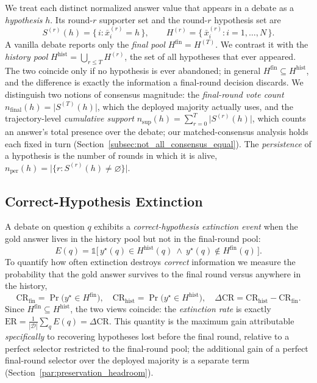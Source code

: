 We treat each distinct normalized answer value that appears in a debate as a \emph{hypothesis} $h$. Its
round-$r$ supporter set and the round-$r$ hypothesis set are
\begin{equation}
S^{(r)}(h)=\{\,i : \bar{x}_i^{(r)}=h\,\},\qquad
H^{(r)}=\{\,\bar{x}_i^{(r)} : i=1,\dots,N\,\}.
\end{equation}
A vanilla debate reports only the \emph{final pool} $H^{\mathrm{fin}}=H^{(T)}$. We contrast it with the
\emph{history pool} $H^{\mathrm{hist}}=\bigcup_{r\le T}H^{(r)}$, the set of all hypotheses that ever
appeared. The two coincide only if no hypothesis is ever abandoned; in general
$H^{\mathrm{fin}}\subseteq H^{\mathrm{hist}}$, and the difference is exactly the information a final-round
decision discards. We distinguish two notions of consensus magnitude: the \emph{final-round vote count}
$n_{\mathrm{final}}(h)=\lvert S^{(T)}(h)\rvert$, which the deployed majority actually uses, and the
trajectory-level \emph{cumulative support} $n_{\mathrm{sup}}(h)=\sum_{r=0}^{T}\lvert S^{(r)}(h)\rvert$,
which counts an answer's total presence over the debate; our matched-consensus analysis holds each fixed in
turn (Section~\ref{subsec:not_all_consensus_equal}). The \emph{persistence} of a hypothesis is the number of
rounds in which it is alive, $n_{\mathrm{per}}(h)=\lvert\{r : S^{(r)}(h)\ne\varnothing\}\rvert$.

\subsection{Correct-Hypothesis Extinction}
\label{subsec:extinction_definition}

A debate on question $q$ exhibits a \emph{correct-hypothesis extinction event} when the gold answer lives in
the history pool but not in the final-round pool:
\begin{equation}
E(q)=\mathbb{1}\!\big[\,y^\star(q)\in H^{\mathrm{hist}}(q)\ \wedge\ y^\star(q)\notin H^{\mathrm{fin}}(q)\,\big].
\label{eq:extinction_event}
\end{equation}
To quantify how often extinction destroys \emph{correct} information we measure the probability that the gold
answer survives to the final round versus anywhere in the history,
\begin{equation}
\mathrm{CR}_{\mathrm{fin}}=\Pr\!\big(y^\star\in H^{\mathrm{fin}}\big),\quad
\mathrm{CR}_{\mathrm{hist}}=\Pr\!\big(y^\star\in H^{\mathrm{hist}}\big),\quad
\Delta\mathrm{CR}=\mathrm{CR}_{\mathrm{hist}}-\mathrm{CR}_{\mathrm{fin}} .
\label{eq:extinction}
\end{equation}
Since $H^{\mathrm{fin}}\subseteq H^{\mathrm{hist}}$, the two views coincide: the \emph{extinction rate} is
exactly $\mathrm{ER}=\tfrac{1}{|\mathcal{D}|}\sum_{q}E(q)=\Delta\mathrm{CR}$. This quantity is the maximum gain
attributable \emph{specifically} to recovering hypotheses lost before the final round, relative to a perfect
selector restricted to the final-round pool; the additional gain of a perfect final-round selector over the
deployed majority is a separate term (Section~\ref{par:preservation_headroom}).

